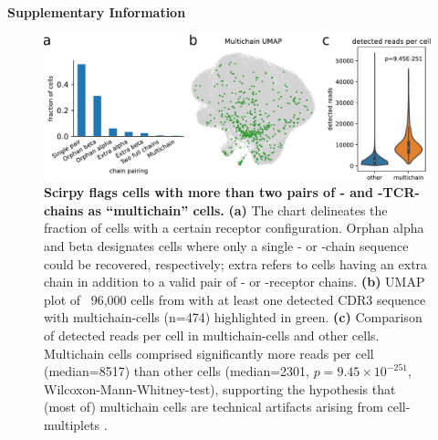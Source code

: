 \documentclass{article}
\begin{document}
\begin{center}
    \normalfont\Large\bfseries{Supplementary Information}
\end{center}
\vspace*{60pt}

\begin{figure}[!hb]
  \centering
  \includegraphics[width=7in]{../figures/multichains.pdf}
  \caption{
    \textbf{Scirpy flags cells with more than two pairs of \textalpha- and \textbeta-TCR-chains as “multichain” cells.} 
    \textbf{(a)} The chart delineates the fraction of
    cells with a certain receptor configuration. Orphan alpha and beta designates cells 
    where only a single \textalpha- or \textbeta-chain sequence could be recovered, 
    respectively; extra refers to cells having an extra chain in addition to a valid pair of
    \textalpha- or \textbeta-receptor chains. 
    \textbf{(b)} UMAP plot of ~96,000 cells from \textcite{Wu2020-vp} with at
    least one detected CDR3 sequence with multichain-cells (n=474) highlighted in green.
    \textbf{(c)} Comparison of detected reads per cell in multichain-cells and other cells.
    Multichain cells comprised significantly more reads per cell (median=8517) than other cells (median=2301, $p=9.45 \times 10^{-251}$, Wilcoxon-Mann-Whitney-test), supporting the hypothesis 
    that (most of) multichain cells are technical artifacts arising from 
    cell-multiplets \cite{Ilicic2016-ny}. }
\end{figure}
\end{document}

